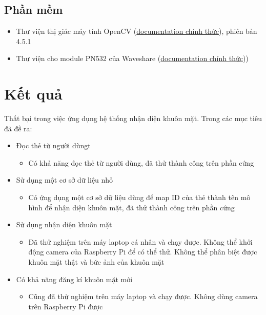 \hypertarget{phux1ea7n-mux1ec1m}{%
\subsection{Phần mềm}\label{phux1ea7n-mux1ec1m}}

\begin{itemize}
\tightlist
\item
  Thư viện thị giác máy tính OpenCV
  (\href{https://docs.opencv.org/4.5.1/}{documentation chính thức}),
  phiên bản 4.5.1
\item
  Thư viện cho module PN532 của Waveshare
  (\href{https://www.waveshare.com/wiki/PN532_NFC_HAT}{documentation
  chính thức}))
\end{itemize}

\hypertarget{kux1ebft-quux1ea3}{%
\section{Kết quả}\label{kux1ebft-quux1ea3}}

Thất bại trong việc ứng dụng hệ thống nhận diện khuôn mặt. Trong các mục
tiêu đã đề ra:

\begin{itemize}
\tightlist
\item
  Đọc thẻ từ người dùngt

  \begin{itemize}
  \tightlist
  \item
    Có khả năng đọc thẻ từ người dùng, đã thử thành công trên phần cứng
  \end{itemize}
\item
  Sử dụng một cơ sở dữ liệu nhỏ

  \begin{itemize}
  \tightlist
  \item
    Có ứng dụng một cơ sở dữ liệu dùng để map ID của thẻ thành tên mô
    hình để nhận diện khuôn mặt, đã thử thành công trên phần cứng
  \end{itemize}
\item
  Sử dụng nhận diện khuôn mặt

  \begin{itemize}
  \tightlist
  \item
    Đã thử nghiệm trên máy laptop cá nhân và chạy được. Không thể khởi
    động camera của Raspberry Pi để có thể thử. Không thể phân biệt được
    khuôn mặt thật và bức ảnh của khuôn mặt
  \end{itemize}
\item
  Có khả năng đăng kí khuôn mặt mới

  \begin{itemize}
  \tightlist
  \item
    Cũng đã thử nghiệm trên máy laptop và chạy được. Không dùng camera
    trên Raspberry Pi được
  \end{itemize}
\end{itemize}


